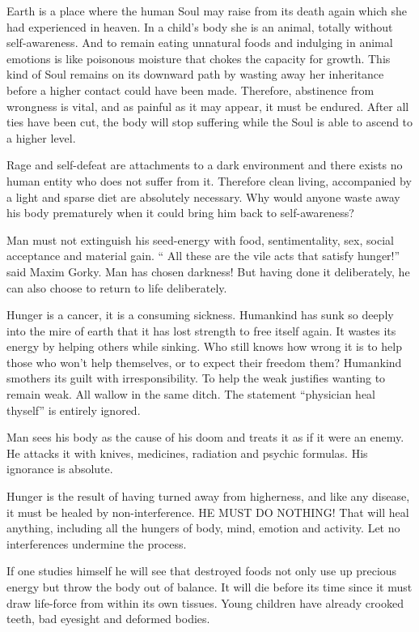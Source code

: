 \documentclass[landscape,twocolumn,letterpaper]{article}
\begin{document}
Earth is a place where the human Soul may raise from its death again
which she had experienced in heaven. In a child's body she is an
animal, totally without self-awareness. And to remain eating unnatural
foods and indulging in animal emotions is like poisonous moisture that
chokes the capacity for growth. This kind of Soul remains on its
downward path by wasting away her inheritance before a higher contact
could have been made. Therefore, abstinence from wrongness is vital,
and as painful as it may appear, it must be endured. After all ties
have been cut, the body will stop suffering while the Soul is able to
ascend to a higher level.

Rage and self-defeat are attachments to a dark environment and there
exists no human entity who does not suffer from it. Therefore clean
living, accompanied by a light and sparse diet are absolutely
necessary. Why would anyone waste away his body prematurely when it
could bring him back to self-awareness?

Man must not extinguish his seed-energy with food, sentimentality,
sex, social acceptance and material gain.  `` All these are the vile
acts that satisfy hunger!'' said Maxim Gorky. Man has chosen darkness! 
But having done it deliberately, he can also choose to return to life
deliberately.

Hunger is a cancer, it is a consuming sickness. Humankind has sunk so
deeply into the mire of earth that it has lost strength to free itself
again. It wastes its energy by helping others while sinking. Who still
knows how wrong it is to help those who won't help themselves, or to
expect their freedom them? Humankind smothers its guilt with
irresponsibility. To help the weak justifies wanting to remain
weak. All wallow in the same ditch. The statement ``physician heal
thyself'' is entirely ignored.

Man sees his body as the cause of his doom and treats it as if it were
an enemy. He attacks it with knives, medicines, radiation and psychic
formulas.  His ignorance is absolute.

Hunger is the result of having turned away from higherness, and like
any disease, it must be healed by non-interference. HE MUST DO
NOTHING! That will heal anything, including all the hungers of body,
mind, emotion and activity.  Let no interferences undermine the
process.

If one studies himself he will see that destroyed foods not only use
up precious energy but throw the body out of balance. It will die
before its time since it must draw life-force from within its own
tissues. Young children have already crooked teeth, bad eyesight and
deformed bodies.
\end{document}
